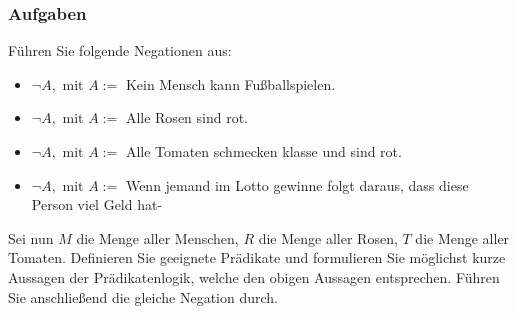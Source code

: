 \subsubsection{Aufgaben}
Führen Sie folgende Negationen aus:
\begin{itemize}
	\item $\neg A, \text{ mit } A:= $ Kein Mensch kann Fußballspielen.
	\item $\neg A, \text{ mit } A := $ Alle Rosen sind rot.
	\item $\neg A, \text{ mit } A := $ Alle Tomaten schmecken klasse und sind rot.
	\item $\neg A, \text{ mit } A := $ Wenn jemand im Lotto gewinne folgt daraus, dass diese Person viel Geld hat-
\end{itemize}
Sei nun $M$ die Menge aller Menschen, $R$ die Menge aller Rosen, $T$ die Menge aller Tomaten. Definieren Sie geeignete Prädikate und formulieren Sie möglichst kurze Aussagen der Prädikatenlogik, welche den obigen Aussagen entsprechen. Führen Sie anschließend die gleiche Negation durch.